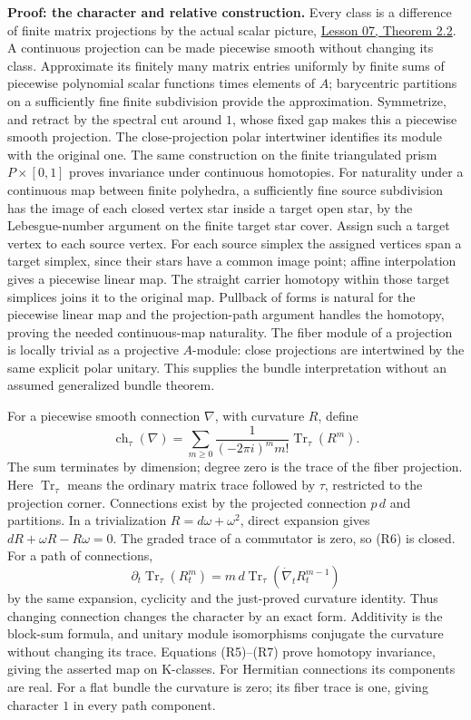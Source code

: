 \documentclass[
  11pt,
]{article}
\begin{document}
\textbf{Proof: the character and relative construction.} Every class is
a difference of finite matrix projections by the actual scalar picture,
\href{KT-KK-07.html\#2-the-even-scalar-fredholm-picture}{Lesson 07,
Theorem 2.2}. A continuous projection can be made piecewise smooth
without changing its class. Approximate its finitely many matrix entries
uniformly by finite sums of piecewise polynomial scalar functions times
elements of \(A\); barycentric partitions on a sufficiently fine finite
subdivision provide the approximation. Symmetrize, and retract by the
spectral cut around \(1\), whose fixed gap makes this a piecewise smooth
projection. The close-projection polar intertwiner identifies its module
with the original one. The same construction on the finite triangulated
prism \(P\times[0,1]\) proves invariance under continuous homotopies.
For naturality under a continuous map between finite polyhedra, a
sufficiently fine source subdivision has the image of each closed vertex
star inside a target open star, by the Lebesgue-number argument on the
finite target star cover. Assign such a target vertex to each source
vertex. For each source simplex the assigned vertices span a target
simplex, since their stars have a common image point; affine
interpolation gives a piecewise linear map. The straight carrier
homotopy within those target simplices joins it to the original map.
Pullback of forms is natural for the piecewise linear map and the
projection-path argument handles the homotopy, proving the needed
continuous-map naturality. The fiber module of a projection is locally
trivial as a projective \(A\)-module: close projections are intertwined
by the same explicit polar unitary. This supplies the bundle
interpretation without an assumed generalized bundle theorem.

For a piecewise smooth connection \(\nabla\), with curvature \(R\),
define \[
 \operatorname{ch}_\tau(\nabla)
       =\sum_{m\geq0}\frac{1}{(-2\pi i)^m m!}
                          \operatorname{Tr}_\tau(R^m).
 \tag{R6}
\] The sum terminates by dimension; degree zero is the trace of the
fiber projection. Here \(\operatorname{Tr}_\tau\) means the ordinary
matrix trace followed by \(\tau\), restricted to the projection corner.
Connections exist by the projected connection \(p\,d\) and partitions.
In a trivialization \(R=d\omega+\omega^2\), direct expansion gives
\(dR+\omega R-R\omega=0\). The graded trace of a commutator is zero, so
(R6) is closed. For a path of connections, \[
 \partial_t\operatorname{Tr}_\tau(R_t^m)
       =m\,d\operatorname{Tr}_\tau(\dot\nabla_t R_t^{m-1})
 \tag{R7}
\] by the same expansion, cyclicity and the just-proved curvature
identity. Thus changing connection changes the character by an exact
form. Additivity is the block-sum formula, and unitary module
isomorphisms conjugate the curvature without changing its trace.
Equations (R5)--(R7) prove homotopy invariance, giving the asserted map
on K-classes. For Hermitian connections its components are real. For a
flat bundle the curvature is zero; its fiber trace is one, giving
character \(1\) in every path component.
\end{document}
